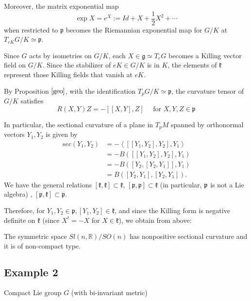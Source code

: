 	Moreover, the matrix exponential map 
	\[
	\exp X=e^{X}:={Id}+X+\frac{1}{2} X^{2}+\cdots
	\]
	when restricted to $\mathfrak{p}$ becomes the Riemannian
	exponential map for $G / K$ at $T_{e K} G / K \simeq
	\mathfrak{p}$. 
	
	Since $G$ acts by isometries on $G / K$, each $X \in
	\mathfrak{g} \simeq T_{e} G$ becomes a Killing vector field
	on $G / K$. Since the stabilizer of $e K \in G / K$ is in
	$K$, the elements of $\mathfrak{k}$ represent those Killing
	fields that vanish at $e K$. 

	By Proposition $\ref{geo}$,
		with the identification $T_{p} G / K \simeq
		\mathfrak{p}$, the curvature tensor of $G / K$ satisfies
		\[
		R(X, Y) Z=-[[X, Y], Z] \quad \text { for } X, Y, Z \in
		\mathfrak{p}
		\]

	
	In particular, the sectional curvature of a plane in $T_{p}
	M$ spanned by orthonormal vectors $Y_{1}, Y_{2}$ is given by
	\[
	\begin{aligned}
		sec\left(Y_{1}, Y_{2}\right)
		&=-\left\langle\left[\left[Y_{1}, Y_{2}\right],
		Y_{2}\right], Y_{1}\right\rangle \\
		&=-B\left(\left[\left[Y_{1}, Y_{2}\right], Y_{2}\right],
		Y_{1}\right) \\
		&=-B\left(\left[Y_{2},\left[Y_{2}, Y_{1}\right]\right],
		Y_{1}\right)\\
		&=B\left(\left[Y_{2}, Y_{1}\right],\left[Y_{2},
		Y_{1}\right]\right).
	\end{aligned}
	\]
	We have the general relations
	$
	[\mathfrak{k}, \mathfrak{k}] \subset \mathfrak{k}
	$,
	$[\mathfrak{p}, \mathfrak{p}] \subset \mathfrak{k}$ (in
	particular, ${\mathfrak p}$ is {not a Lie algebra) },
	$
	[\mathfrak{p}, \mathfrak{k}] \subset \mathfrak{p}
	$.
	
	Therefore, for $Y_{1}, Y_{2} \in \mathfrak{p},\left[Y_{1},
	Y_{2}\right] \in \mathfrak{k}$, and since the Killing form is
	negative definite on $\mathfrak{k}$ (since $X^{t}=-X$ for $X
	\in \mathfrak{k}$), we obtain from above:
	
		The symmetric space ${Sl}(n, \mathbb{R}) / S O(n)$ has
		nonpositive sectional curvature and it is of non-compact
		type.

\subsection{Example 2}
	
	\begin{center}
			Compact Lie group $G$ (with bi-invariant metric)
	\end{center}	
	
